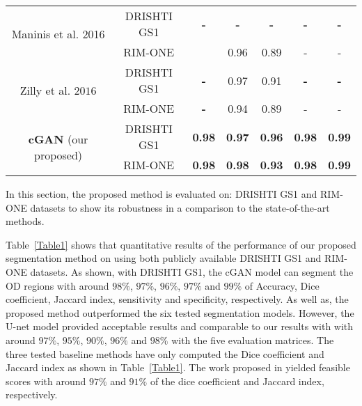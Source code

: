 \documentclass{IOS-Book-Article}
\begin{document}
\begin{table}[htb]
{\begin{tabular}{|c|c|c|c|c|c|c|}
\multirow{2}{*}{Maninis et al. 2016 \cite{maninis2016deep}}    & DRISHTI GS1             & \textbf{-} & \textbf{-} & \textbf{-} & \textbf{-} & \textbf{-} \\ \cline{2-7} 

                             & RIM-ONE  &          & 0.96          & 0.89          & -          & -          \\ \hline
                             
                             
\multirow{2}{*}{Zilly et al. $2016$ \cite{zilly2015boosting}}    & DRISHTI GS1             & \textbf{-} & 0.97 & 0.91 & \textbf{-} & \textbf{-} \\ \cline{2-7} 

                             & RIM-ONE  & \textbf{-} & 0.94          & 0.89          & -          & -          \\ \hline
                             
                             
\multirow{2}{*}{\textbf{cGAN} (our proposed)}      & DRISHTI GS1             & \textbf{0.98}          & \textbf{0.97 }         & \textbf{0.96 }         & \textbf{0.98  }        & \textbf{0.99 }         \\ \cline{2-7} 

                             & RIM-ONE  & \textbf{0.98}          & \textbf{0.98}          & \textbf{0.93}          & \textbf{0.98}          &\textbf{ 0.99 }         \\ \hline
\end{tabular}}
\end{table}

In this section, the proposed method is evaluated on: DRISHTI GS1 and RIM-ONE datasets
to show its robustness in a comparison to the state-of-the-art methods. 

Table~\ref{Table1} shows that quantitative results of the performance of our proposed segmentation method on using both publicly available DRISHTI GS1 and RIM-ONE datasets. As shown, with DRISHTI GS1, the cGAN model can segment the OD regions with around $98\%$, $97\%$, $96\%$, $97\%$ and $99\%$ of Accuracy, Dice coefficient, Jaccard index, sensitivity and specificity, respectively. As well as, the proposed method outperformed the six tested segmentation models. However, the U-net model provided acceptable results and comparable to our results with with around $97\%$, $95\%$, $90\%$, $96\%$ and $98\%$ with the five evaluation matrices. The three tested baseline methods have only computed the Dice coefficient and Jaccard index as shown in Table~\ref{Table1}. The work proposed in \cite{zilly2015boosting} yielded feasible scores with around $97\%$ and $91\%$ of the dice coefficient and Jaccard index, respectively.
\end{document}
